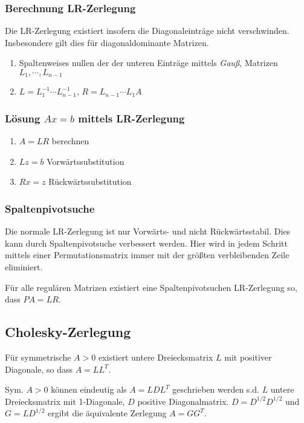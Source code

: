 \subsubsection*{Berechnung LR-Zerlegung}

Die LR-Zerlegung existiert insofern die Diagonaleinträge nicht verschwinden. Insbesondere gilt dies für diagonaldominante Matrizen.

\begin{enumerate}
	\item Spaltenweises nullen der der unteren Einträge mittels \emph{Gauß}, Matrizen $L_1, \cdots, L_{n-1}$
	\item $L = L_1^{-1} \cdots L_{n-1}^{-1}$, $R=L_{n-1} \cdots L_1 A$
\end{enumerate}

\subsubsection*{Lösung $Ax=b$ mittels LR-Zerlegung}

\begin{enumerate}
	\item $A=LR$ berechnen
	\item $Lz=b$ Vorwärtssubstitution
	\item $Rx=z$ Rückwärtssubstitution
\end{enumerate}

\subsubsection*{Spaltenpivotsuche}

Die normale LR-Zerlegung ist nur Vorwärts- und nicht Rückwärtsstabil. Dies kann durch Spaltenpivotsuche verbessert werden. Hier wird in jedem Schritt mittels einer Permutationsmatrix immer mit der größten verbleibenden Zeile eliminiert.

\vspace{1mm}

Für alle regulären Matrizen existiert eine Spaltenpivotsuchen LR-Zerlegung so, dass $PA=LR$.

\subsection*{Cholesky-Zerlegung}

Für symmetrische $A > 0$ existiert untere Dreiecksmatrix $L$ mit positiver Diagonale, so dass $A = LL^T$.

Sym. $A > 0$ können eindeutig als $A=LDL^T$ geschrieben werden s.d. $L$ untere Dreiecksmatrix mit 1-Diagonale, $D$ positive Diagonalmatrix. $D=D^{1/2}D^{1/2}$ und $G=LD^{1/2}$ ergibt die äquivalente Zerlegung $A=GG^T$.

